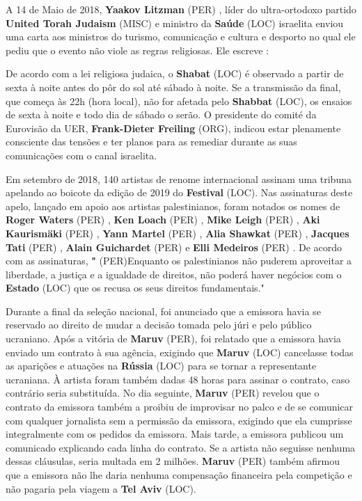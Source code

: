 \documentclass[12pt,a4paper]{article}
\begin{document}
A 14 de Maio de 2018, \textbf{Yaakov Litzman} (PER) , líder do ultra-ortodoxo partido \textbf{United Torah Judaism} (MISC) e ministro da \textbf{Saúde} (LOC) israelita enviou uma carta aos ministros do turismo, comunicação e cultura e desporto no qual ele pediu que o evento não viole as regras religiosas. Ele escreve :

De acordo com a lei religiosa judaica, o \textbf{Shabat} (LOC) é observado a partir de sexta à noite antes do pôr do sol até sábado à noite. Se a transmissão da final, que começa às 22h (hora local), não for afetada pelo \textbf{Shabbat} (LOC), os ensaios de sexta à noite e todo dia de sábado o serão. O presidente do comité da Eurovisão da UER, \textbf{Frank-Dieter Freiling} (ORG), indicou estar plenamente consciente das tensões e ter planos para as remediar durante as suas comunicações com o canal israelita.

Em setembro de 2018, 140 artistas de renome internacional assinam uma tribuna apelando ao boicote da edição de 2019 do \textbf{Festival} (LOC). Nas assinaturas deste apelo, lançado em apoio aos artistas palestinianos, foram notados os nomes de \textbf{Roger Waters} (PER) , \textbf{Ken Loach} (PER) , \textbf{Mike Leigh} (PER) , \textbf{Aki Kaurismäki} (PER) , \textbf{Yann Martel} (PER) , \textbf{Alia Shawkat} (PER) , \textbf{Jacques Tati} (PER) , \textbf{Alain Guichardet} (PER) e \textbf{Elli Medeiros} (PER) . De acordo com as assinaturas, \textbf{"} (PER)Enquanto os palestinianos não puderem aproveitar a liberdade, a justiça e a igualdade de direitos, não poderá haver negócios com o \textbf{Estado} (LOC) que os recusa os seus direitos fundamentais."

Durante a final da seleção nacional, foi anunciado que a emissora havia se reservado ao direito de mudar a decisão tomada pelo júri e pelo público ucraniano. Após a vitória de \textbf{Maruv} (PER), foi relatado que a emissora havia enviado um contrato à sua agência, exigindo que \textbf{Maruv} (LOC) cancelasse todas as aparições e atuações na \textbf{Rússia} (LOC) para se tornar a representante ucraniana. À artista foram também dadas 48 horas para assinar o contrato, caso contrário seria substituída. No dia seguinte, \textbf{Maruv} (PER) revelou que o contrato da emissora também a proibiu de improvisar no palco e de se comunicar com qualquer jornalista sem a permissão da emissora, exigindo que ela cumprisse integralmente com os pedidos da emissora. Mais tarde, a emissora publicou um comunicado explicando cada linha do contrato. Se a artista não seguisse nenhuma dessas cláusulas, seria multada em  2 milhões. \textbf{Maruv} (PER) também afirmou que a emissora não lhe daria nenhuma compensação financeira pela competição e não pagaria pela viagem a \textbf{Tel Aviv} (LOC).
\end{document}

